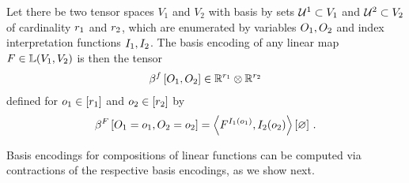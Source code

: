 \begin{definition}
    Let there be two tensor spaces $V_1$ and $V_2$ with basis by sets $\mathcal{U}^{1}\subset V_1$ and $\mathcal{U}^{2}\subset V_2$ of cardinality $r_{1}$ and $r_{2}$, which are enumerated by variables $O_{1},O_{2}$ and index interpretation functions $I_{1},I_{2}$.
    The basis encoding of any linear map $F\in\mathbb{L}(V_1,V_2)$ is then the tensor
    \begin{align*}
        \beta^{f}\left[O_{1},O_{2}\right] \in \mathbb{R}^{r_{1}} \otimes \mathbb{R}^{r_{2}}
    \end{align*}
    defined for $o_{1}\in[r_{1}]$ and $o_{2}\in[r_{2}]$ by
    \begin{align*}
        \beta^{F}\left[O_{1}=o_{1},O_{2}=o_{2}\right]
        = \left\langle F^{I_{1}(o_{1})},I_{2}(o_{2})\right\rangle \left[ \varnothing \right] \, .
    \end{align*}
\end{definition}

Basis encodings for compositions of linear functions can be computed via contractions of the respective basis encodings, as we show next.

